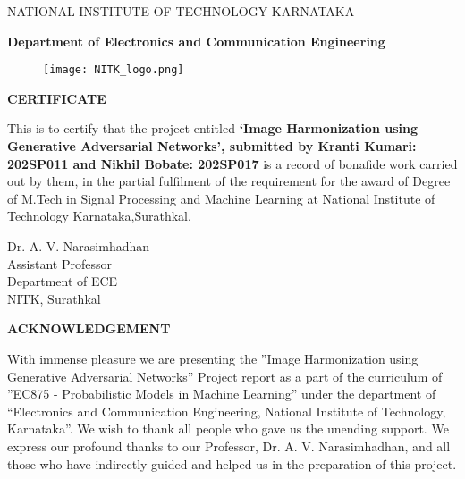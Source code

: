 \documentclass{article}
\begin{document}
\newpage

\begin{center}
\large NATIONAL INSTITUTE OF TECHNOLOGY KARNATAKA
\end{center}
\begin{center}
\textbf{\large Department of Electronics and Communication Engineering}
\end{center}

\begin{figure}[htp]
    \centering
    \Large\texttt{[image: NITK\_logo.png]}
    \label{fig:logo2}
\end{figure}

\begin{center}
\textbf{\Large CERTIFICATE}
\end{center}

\begin{center}
\end{center}

\large This is to certify that the project entitled \textbf{‘Image Harmonization using Generative Adversarial Networks’, submitted by Kranti Kumari: 202SP011 and Nikhil Bobate: 202SP017} is a record of bonafide work carried out by them, in the partial fulfilment of the requirement for the award of Degree of M.Tech in Signal Processing and Machine Learning at National Institute of Technology Karnataka,Surathkal.


\begin{center}
\end{center}
\begin{center}
\end{center}


\begin{flushleft}
Dr. A. V. Narasimhadhan\\
Assistant Professor\\
Department of ECE\\
NITK, Surathkal
\end{flushleft}


\newpage

\begin{center}
\textbf{\Large ACKNOWLEDGEMENT}
\end{center}

\begin{center}
\end{center}
\begin{center}
\end{center}

With immense pleasure we are presenting the ”Image Harmonization using Generative Adversarial Networks” Project report as a part of the curriculum of ”EC875 - Probabilistic Models in Machine Learning” under the department of “Electronics and Communication Engineering, National Institute of Technology, Karnataka”. We wish to thank all people who gave us the unending support. We express our profound thanks to our Professor, Dr. A. V. Narasimhadhan, and all those who have indirectly guided and helped us in the preparation of this project.
\end{document}
